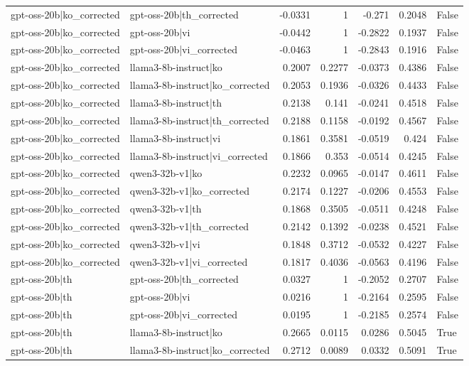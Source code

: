 \begin{table}
\begin{tabular}{l l r r r r l}
gpt-oss-20b|ko_corrected & gpt-oss-20b|th_corrected & -0.0331 & 1 & -0.271 & 0.2048 & False \\
gpt-oss-20b|ko_corrected & gpt-oss-20b|vi & -0.0442 & 1 & -0.2822 & 0.1937 & False \\
gpt-oss-20b|ko_corrected & gpt-oss-20b|vi_corrected & -0.0463 & 1 & -0.2843 & 0.1916 & False \\
gpt-oss-20b|ko_corrected & llama3-8b-instruct|ko & 0.2007 & 0.2277 & -0.0373 & 0.4386 & False \\
gpt-oss-20b|ko_corrected & llama3-8b-instruct|ko_corrected & 0.2053 & 0.1936 & -0.0326 & 0.4433 & False \\
gpt-oss-20b|ko_corrected & llama3-8b-instruct|th & 0.2138 & 0.141 & -0.0241 & 0.4518 & False \\
gpt-oss-20b|ko_corrected & llama3-8b-instruct|th_corrected & 0.2188 & 0.1158 & -0.0192 & 0.4567 & False \\
gpt-oss-20b|ko_corrected & llama3-8b-instruct|vi & 0.1861 & 0.3581 & -0.0519 & 0.424 & False \\
gpt-oss-20b|ko_corrected & llama3-8b-instruct|vi_corrected & 0.1866 & 0.353 & -0.0514 & 0.4245 & False \\
gpt-oss-20b|ko_corrected & qwen3-32b-v1|ko & 0.2232 & 0.0965 & -0.0147 & 0.4611 & False \\
gpt-oss-20b|ko_corrected & qwen3-32b-v1|ko_corrected & 0.2174 & 0.1227 & -0.0206 & 0.4553 & False \\
gpt-oss-20b|ko_corrected & qwen3-32b-v1|th & 0.1868 & 0.3505 & -0.0511 & 0.4248 & False \\
gpt-oss-20b|ko_corrected & qwen3-32b-v1|th_corrected & 0.2142 & 0.1392 & -0.0238 & 0.4521 & False \\
gpt-oss-20b|ko_corrected & qwen3-32b-v1|vi & 0.1848 & 0.3712 & -0.0532 & 0.4227 & False \\
gpt-oss-20b|ko_corrected & qwen3-32b-v1|vi_corrected & 0.1817 & 0.4036 & -0.0563 & 0.4196 & False \\
gpt-oss-20b|th & gpt-oss-20b|th_corrected & 0.0327 & 1 & -0.2052 & 0.2707 & False \\
gpt-oss-20b|th & gpt-oss-20b|vi & 0.0216 & 1 & -0.2164 & 0.2595 & False \\
gpt-oss-20b|th & gpt-oss-20b|vi_corrected & 0.0195 & 1 & -0.2185 & 0.2574 & False \\
gpt-oss-20b|th & llama3-8b-instruct|ko & 0.2665 & 0.0115 & 0.0286 & 0.5045 & True \\
gpt-oss-20b|th & llama3-8b-instruct|ko_corrected & 0.2712 & 0.0089 & 0.0332 & 0.5091 & True \\

\end{tabular}
\end{table}
